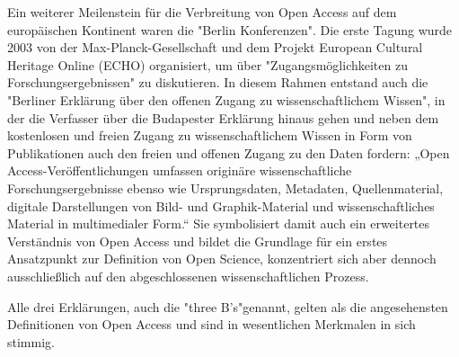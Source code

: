 Ein weiterer Meilenstein für die Verbreitung von Open Access auf dem europäischen Kontinent waren die "Berlin Konferenzen"\cite{CREATe_2014}. Die erste Tagung wurde 2003 von der Max-Planck-Gesellschaft und dem Projekt European Cultural Heritage Online (ECHO) organisiert, um über "Zugangsmöglichkeiten zu Forschungsergebnissen" zu diskutieren. In diesem Rahmen entstand auch die "Berliner Erklärung über den offenen Zugang zu wissenschaftlichem Wissen"\cite{berliner_erklaerung_2003}, in der die Verfasser über die Budapester Erklärung hinaus gehen und neben dem kostenlosen und freien Zugang zu wissenschaftlichem Wissen in Form von Publikationen auch den freien und offenen Zugang zu den Daten fordern: „Open Access-Veröffentlichungen umfassen originäre wissenschaftliche Forschungsergebnisse ebenso wie Ursprungsdaten, Metadaten, Quellenmaterial, digitale Darstellungen von Bild- und Graphik-Material und wissenschaftliches Material in multimedialer Form.“\cite{berliner_erklaerung_2003} Sie symbolisiert damit auch ein erweitertes Verständnis von Open Access und bildet die Grundlage für ein erstes Ansatzpunkt zur Definition von Open Science, konzentriert sich aber dennoch ausschließlich auf den abgeschlossenen wissenschaftlichen Prozess\cite{suchen}.

Alle drei Erklärungen, auch die "three B's"\cite{suber_2004_praising_oa}genannt, gelten als die angesehensten Definitionen von Open Access und sind in wesentlichen Merkmalen in sich stimmig\cite{albert_2006_open_implications}.